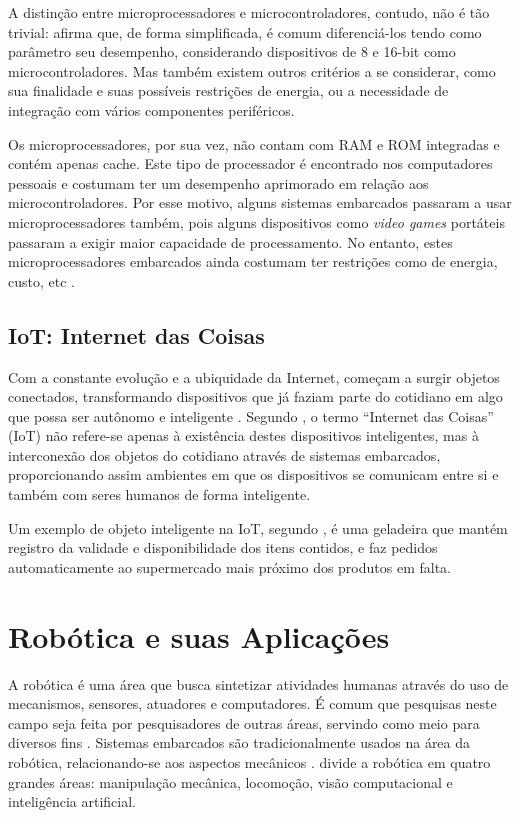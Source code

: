 A distinção entre microprocessadores e microcontroladores, contudo, não é tão trivial:  afirma que, de forma simplificada, é comum diferenciá-los tendo como parâmetro seu desempenho, considerando dispositivos de 8 e 16-bit como microcontroladores. Mas também existem outros critérios a se considerar, como sua finalidade e suas possíveis restrições de energia, ou a necessidade de integração com vários componentes periféricos.

Os microprocessadores, por sua vez, não contam com RAM e ROM integradas e contém apenas cache. Este tipo de processador é encontrado nos computadores pessoais e costumam ter um desempenho aprimorado em relação aos microcontroladores. Por esse motivo, alguns sistemas embarcados passaram a usar microprocessadores também, pois alguns dispositivos como \textit{video games} portáteis passaram a exigir maior capacidade de processamento. No entanto, estes microprocessadores embarcados ainda costumam ter restrições como de energia, custo, etc \cite{schlett:1998}.

\subsection{IoT: Internet das Coisas}
Com a constante evolução e a ubiquidade da Internet, começam a surgir objetos conectados, transformando dispositivos que já faziam parte do cotidiano em algo que possa ser autônomo e inteligente \cite{kopetz:2011}.  Segundo , o termo ``Internet das Coisas'' (IoT)  não refere-se apenas à existência destes dispositivos inteligentes, mas à interconexão dos objetos do cotidiano através de sistemas embarcados, proporcionando assim ambientes em que os dispositivos se comunicam entre si e também com seres humanos de forma inteligente.

Um exemplo de objeto inteligente na IoT, segundo , é uma geladeira que mantém registro da validade e disponibilidade dos itens contidos, e faz pedidos automaticamente ao supermercado mais próximo dos produtos em falta.


\section{Robótica e suas Aplicações}
\label{sec:robotica}
A robótica é uma área que busca sintetizar atividades humanas através do uso de mecanismos, sensores, atuadores e computadores. É comum que pesquisas neste campo seja feita por pesquisadores de outras áreas, servindo como meio para diversos fins \cite{craig:2005}. Sistemas embarcados são tradicionalmente usados na área da robótica, relacionando-se aos aspectos mecânicos \cite{marwedel:2010}.  divide a robótica em quatro grandes áreas: manipulação mecânica, locomoção, visão computacional e inteligência artificial.

